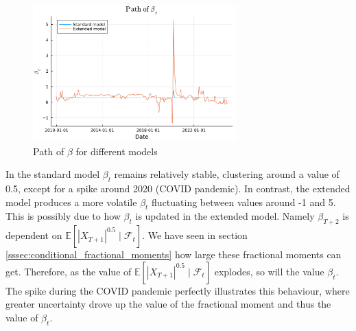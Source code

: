 \begin{figure}[H]
    \centering
    \includegraphics[width=0.7\textwidth]{figures/beta_path_alternative.pdf}
    \caption{Path of \(\beta\) for different models}
    \label{fig:beta_path}
\end{figure}
In the standard model \(\beta_t\) remains relatively stable, clustering around a value of 0.5, except for a spike around 2020 (COVID pandemic). In contrast, the extended model produces a more volatile \(\beta_t\) fluctuating between values around -1 and 5. This is possibly due to how \(\beta_t\) is updated in the extended model. Namely \(\beta_{T + 2}\) is dependent on \(\mathbb{E}[|X_{T + 1}|^{0.5} \mid \mathcal{F}_t]\). We have seen in section \ref{sssec:conditional_fractional_moments} how large these fractional moments can get. Therefore, as the value of \(\mathbb{E}[|X_{T + 1}|^{0.5} \mid \mathcal{F}_t]\) explodes, so will the value \(\beta_t\). The spike during the COVID pandemic perfectly illustrates this behaviour, where greater uncertainty drove up the value of the fractional moment and thus the value of \(\beta_t\).

